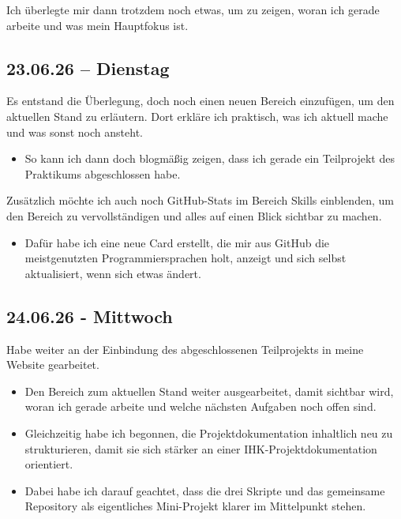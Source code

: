 Ich überlegte mir dann trotzdem noch etwas, um zu zeigen, woran ich gerade arbeite und was mein Hauptfokus ist.

\subsection{23.06.26 -- Dienstag}

Es entstand die Überlegung, doch noch einen neuen Bereich einzufügen, um den aktuellen Stand zu erläutern.
Dort erkläre ich praktisch, was ich aktuell mache und was sonst noch ansteht.

\begin{itemize}
    \item So kann ich dann doch blogmäßig zeigen, dass ich gerade ein Teilprojekt des Praktikums abgeschlossen habe.
\end{itemize}

Zusätzlich möchte ich auch noch GitHub-Stats im Bereich Skills einblenden, um den Bereich zu vervollständigen und alles auf einen Blick sichtbar zu machen.

\begin{itemize}
    \item Dafür habe ich eine neue Card erstellt, die mir aus GitHub die meistgenutzten Programmiersprachen holt, anzeigt und sich selbst aktualisiert, wenn sich etwas ändert.
\end{itemize}

\subsection{24.06.26 - Mittwoch}

Habe weiter an der Einbindung des abgeschlossenen Teilprojekts in meine Website gearbeitet.

\begin{itemize}
    \item Den Bereich zum aktuellen Stand weiter ausgearbeitet, damit sichtbar wird, woran ich gerade arbeite und welche nächsten Aufgaben noch offen sind.
    \item Gleichzeitig habe ich begonnen, die Projektdokumentation inhaltlich neu zu strukturieren, damit sie sich stärker an einer IHK-Projektdokumentation orientiert.
    \item Dabei habe ich darauf geachtet, dass die drei Skripte und das gemeinsame Repository als eigentliches Mini-Projekt klarer im Mittelpunkt stehen.
\end{itemize}

